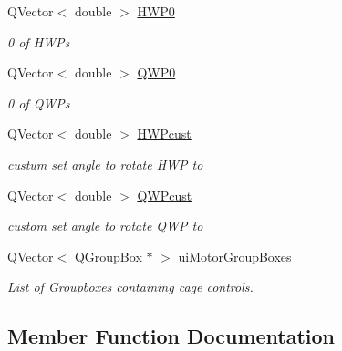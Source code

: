 \begin{DoxyCompactItemize}
\mbox{\label{classcagecontrol_a89582491b0b4f2421abe2e7cad735505}} 
Q\+Vector$<$ double $>$ \hyperlink{classcagecontrol_a89582491b0b4f2421abe2e7cad735505}{H\+W\+P0}
\begin{DoxyCompactList}\small\item\em \textquotesingle{}0\textquotesingle{} of H\+W\+Ps \end{DoxyCompactList}\item 
\mbox{\label{classcagecontrol_a6f1fca7829c5e2c25e6a15969aa9a622}} 
Q\+Vector$<$ double $>$ \hyperlink{classcagecontrol_a6f1fca7829c5e2c25e6a15969aa9a622}{Q\+W\+P0}
\begin{DoxyCompactList}\small\item\em \textquotesingle{}0\textquotesingle{} of Q\+W\+Ps \end{DoxyCompactList}\item 
\mbox{\label{classcagecontrol_a1502c9ebc5e04d61af76492d563f9e0e}} 
Q\+Vector$<$ double $>$ \hyperlink{classcagecontrol_a1502c9ebc5e04d61af76492d563f9e0e}{H\+W\+Pcust}
\begin{DoxyCompactList}\small\item\em custum set angle to rotate H\+WP to \end{DoxyCompactList}\item 
\mbox{\label{classcagecontrol_a43e35156274c70bda842d25680a9159d}} 
Q\+Vector$<$ double $>$ \hyperlink{classcagecontrol_a43e35156274c70bda842d25680a9159d}{Q\+W\+Pcust}
\begin{DoxyCompactList}\small\item\em custom set angle to rotate Q\+WP to \end{DoxyCompactList}\item 
\mbox{\label{classcagecontrol_aced71e7c8e0053e6d4291bcee17c9af7}} 
Q\+Vector$<$ Q\+Group\+Box $\ast$ $>$ \hyperlink{classcagecontrol_aced71e7c8e0053e6d4291bcee17c9af7}{ui\+Motor\+Group\+Boxes}
\begin{DoxyCompactList}\small\item\em List of Groupboxes containing cage controls. \end{DoxyCompactList}\end{DoxyCompactItemize}


\subsection{Member Function Documentation}
\mbox{\label{classcagecontrol_a56c01018dbd0d16a360106c438539c9e}} 
